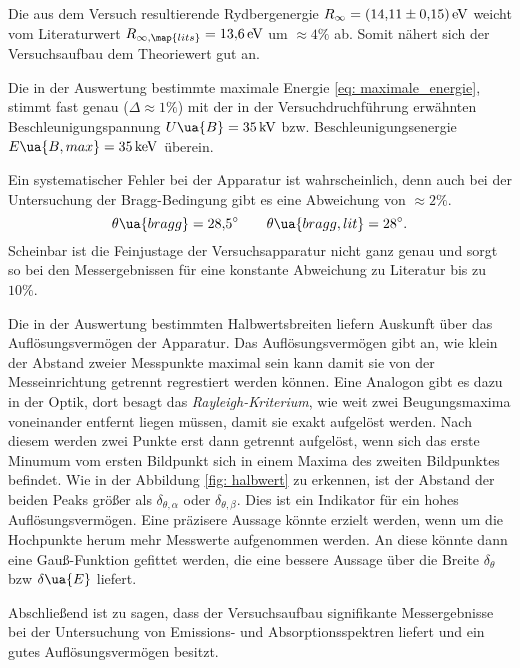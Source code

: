 Die aus dem Versuch resultierende Rydbergenergie $R_\infty=\SI{14.11\pm0.15}{\eV}$ weicht vom Literaturwert \cite{anleitung602} %
$R_{\infty,\map{lits}}=\SI{13.6}{\eV}$ um $\approx 4 \%$ ab. Somit nähert sich der
Versuchsaufbau dem Theoriewert gut an.

Die in der Auswertung bestimmte maximale Energie \eqref{eq: maximale_energie}, stimmt fast genau ($\Delta\approx 1\%$) mit der
in der Versuchdruchführung erwähnten Beschleunigungspannung $U\ua{B}=\SI{35}{\kilo\volt}$ bzw. Beschleunigungsenergie
$E\ua{B,max}=\SI{35}{\kilo\eV}$ überein.

Ein systematischer Fehler bei der Apparatur ist wahrscheinlich, denn auch bei der %
Untersuchung der Bragg-Bedingung gibt es eine Abweichung von $\approx 2\%$.
\begin{equation*}
  \theta\ua{bragg}=\SI{28.5}{\degree}  \qquad \theta\ua{bragg,lit}=\SI{28}{\degree}.
\end{equation*}
Scheinbar ist die Feinjustage der Versuchsapparatur nicht ganz genau und sorgt so bei den Messergebnissen
für eine konstante Abweichung zu Literatur bis zu $10\%$.

Die in der Auswertung bestimmten Halbwertsbreiten liefern Auskunft über das
Auflösungsvermögen der Apparatur. %
Das Auflösungsvermögen gibt an, wie klein der Abstand zweier Messpunkte maximal sein kann damit sie von der Messeinrichtung
getrennt regrestiert werden können.
Eine Analogon gibt es dazu in der Optik, dort besagt das \emph{Rayleigh-Kriterium},
wie weit zwei Beugungsmaxima voneinander entfernt liegen müssen, damit sie exakt aufgelöst werden.
Nach diesem werden zwei Punkte erst dann getrennt aufgelöst, wenn sich das erste Minumum vom ersten Bildpunkt
sich in einem Maxima des zweiten Bildpunktes befindet.
Wie in der Abbildung \ref{fig: halbwert} zu erkennen, ist der Abstand der beiden Peaks
größer als $\delta_{\theta,\alpha}$ oder $\delta_{\theta,\beta}$. Dies ist ein Indikator
für ein hohes Auflösungsvermögen. Eine präzisere Aussage könnte erzielt werden,
wenn um die Hochpunkte herum mehr Messwerte aufgenommen werden. An diese
könnte dann eine Gauß-Funktion gefittet werden, die eine bessere Aussage über die
Breite $\delta_\theta$ bzw $\delta\ua{E}$ liefert.

Abschließend ist zu sagen, dass der Versuchsaufbau signifikante Messergebnisse
bei der Untersuchung von Emissions- und Absorptionsspektren liefert und ein
gutes Auflösungsvermögen besitzt.
